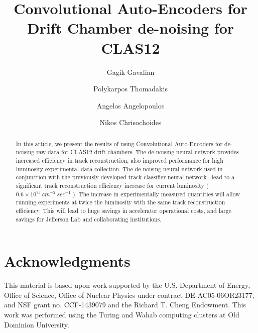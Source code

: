 \documentclass[preprint,12pt]{elsarticle}
\title{Convolutional Auto-Encoders for Drift Chamber de-noising for CLAS12}
\author[1]{Gagik Gavalian}
\author[2]{Polykarpos Thomadakis}
\author[2]{Angelos Angelopoulos}
\author[2]{Nikos Chrisochoides}
\begin{document}
\begin{abstract}
In this article, we present the results of using Convolutional Auto-Encoders for de-noising raw data for CLAS12 drift chambers.
The de-noising neural network provides increased efficiency in track reconstruction, also improved performance for high 
luminosity experimental data collection. The de-noising neural network used in conjunction with the previously developed track 
classifier neural network~\cite{Gavalian:2022hfa} lead to a significant track reconstruction efficiency increase for current luminosity
($0.6\times10^{35}~cm^{-2}~sec^{-1}$ ). The increase in experimentally measured quantities will allow running experiments at twice 
the luminosity with the same track reconstruction efficiency. This will lead to huge savings in accelerator operational costs, and large 
savings for Jefferson Lab and collaborating institutions.
\end{abstract}
\maketitle














%
%



\newpage

\section{Acknowledgments}

This material is based upon work supported by the U.S. Department of Energy, Office of Science,
Office of Nuclear Physics under contract DE-AC05-06OR23177, and NSF grant no. CCF-1439079 and
the Richard T. Cheng Endowment. This work was performed using the Turing and Wahab computing
clusters at Old Dominion University.
 
\newpage


\end{document}
